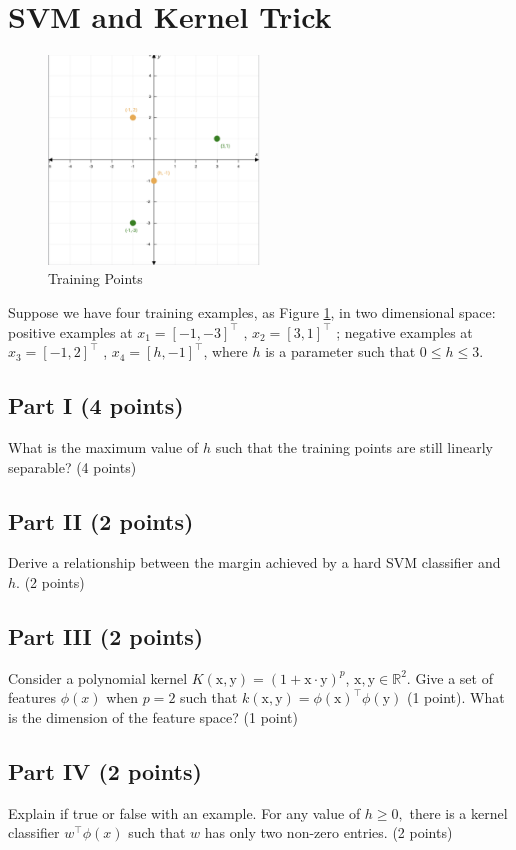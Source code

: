 \documentclass[12pt]{article}
\begin{document}
\section{SVM and Kernel Trick}

\begin{figure}[h]
    \centering
    \includegraphics[width=0.5\textwidth]{midterm/SVM.png}
    \caption{Training Points}
    \label{fig:svm}
\end{figure}

Suppose we have four training examples, as Figure \ref{fig:svm}, in two dimensional space: positive examples at $x_1 = [-1,-3]^\top$ ,  $x_2 = [3,1]^\top$ ; negative examples at $x_3 = [-1,2]^\top$ ,  $x_4 = [h,-1]^\top$, where $h$ is a parameter such that $0\leq h \leq 3$. 
\subsection*{Part I (4 points)}
    What is the maximum value of $h$ such that the training points are still linearly separable? (4 points)
    \subsection*{Part II (2 points)}
    Derive a relationship between the margin achieved by a hard SVM classifier and $h$. (2 points)
    \subsection*{Part III (2 points)}
     Consider a polynomial kernel $K(\mathrm{x},\mathrm{y}) = (1 + \mathrm{x}\cdot \mathrm{y})^{p}$, $\mathrm{x},\mathrm{y}\in \mathbb{R}^2.$ Give a set of features $\phi(x)$ when $p = 2$ such that $k(\mathrm{x},\mathrm{y})=\phi(\mathrm{x})^\top \phi(\mathrm{y})$ (1 point). What is the dimension of the feature space? (1 point)
     \subsection*{Part IV (2 points)}
 Explain if true or false with an example. For any value of $h \geq 0,$ there is a kernel classifier $w^\top \phi(x)$ such that $w$ has only two non-zero entries. (2 points)
 
\end{document}
